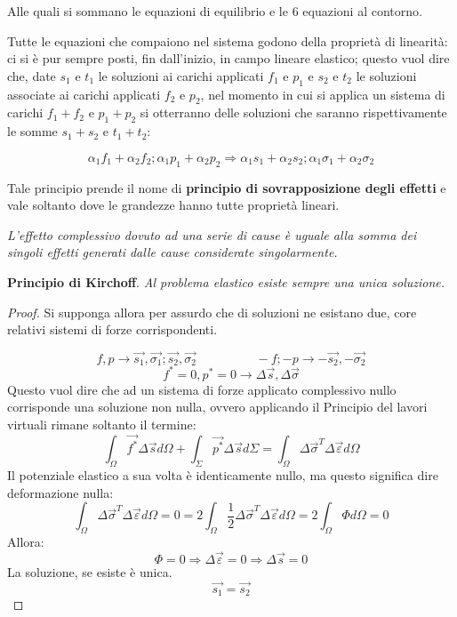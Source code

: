 \documentclass{article}
\begin{document}
\begin{adjustwidth}{2in}{}
	Alle quali si sommano le equazioni di equilibrio e le 6 equazioni al contorno. 
	\newpage
	
	Tutte le equazioni che compaiono nel sistema godono della proprietà di linearità: ci si è pur sempre posti, fin dall'inizio, in campo lineare elastico; questo vuol dire che, date $ s_1 $ e $ t_1 $ le soluzioni ai carichi applicati $ f_1 $ e $ p_1 $ e $ s_2 $ e $ t_2 $ le soluzioni associate ai carichi applicati $ f_2 $ e
	$ p_2 $, nel momento in cui si applica un sistema di carichi $ f_1+f_2 $ e $ p_1+p_2 $ si otterranno delle soluzioni che saranno rispettivamente le somme $s_1+s_2$ e $t_1+t_2$:
	
	\[
	\alpha_1f_1 + \alpha_2f_2; \alpha_1p_1 + \alpha_2p_2 \Rightarrow \alpha_1s_1 + \alpha_2s_2; \alpha_1\sigma_1 + \alpha_2\sigma_2
	\]
	
	Tale principio prende il nome di\textbf{ principio di sovrapposizione degli effetti} e vale soltanto dove le grandezze hanno tutte proprietà lineari. \newline
	
	\textit{L’effetto complessivo dovuto ad una serie di cause è uguale alla somma dei singoli effetti generati dalle cause considerate singolarmente.} \newline 

	\textbf{Principio di Kirchoff}. \textit{Al problema elastico esiste sempre una unica soluzione.} \newline 
	\begin{proof}
		Si supponga allora per assurdo che di soluzioni ne esistano due, core relativi sistemi di forze corrispondenti.
		
		\[
		f,p \rightarrow \vec{s_1},  \vec{\sigma_1}; 
		\vec{s_2}, \vec{\sigma_2} 
		\hspace{2cm} -f; -p \rightarrow -\vec{s_2}, -\vec{\sigma_2}
		\]
		\[
		f^*=0, p^*=0 \rightarrow \Delta \vec{s}, \Delta \vec{\sigma}
		\]
		Questo vuol dire che ad un sistema di forze applicato complessivo nullo corrisponde una soluzione non nulla, ovvero applicando il Principio del lavori virtuali rimane soltanto il termine:
		\[ 
		\int_{\Omega} \vec{f^*} \Delta\vec{s} d\Omega + \int_{\Sigma}\vec{p^*} \Delta\vec{s} d\Sigma = \int_{\Omega}  \Delta\vec{\sigma}^T\Delta\vec{\varepsilon} d\Omega
		\]
		Il potenziale elastico a sua volta è identicamente nullo, ma questo significa dire deformazione nulla:
		\[ 
		\int_{\Omega}  \Delta\vec{\sigma}^T\Delta\vec{\varepsilon} d\Omega = 0 = 2\int_{\Omega} \dfrac{1}{2} \Delta\vec{\sigma}^T\Delta\vec{\varepsilon} d\Omega = 2\int_{\Omega} \Phi d\Omega = 0
		\]
		Allora:
		\[
		\Phi = 0 \Rightarrow \Delta\vec{\varepsilon} = 0 \Rightarrow \Delta\vec{s} = 0\]
		La soluzione, se esiste è unica.
		\[ \vec{s_1} = \vec{s_2}	\]
	\end{proof}


\end{adjustwidth}
\end{document}
